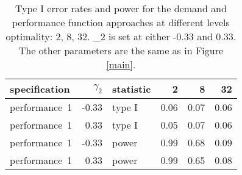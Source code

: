 \begin{table}[ht]
\centering
\begingroup\footnotesize
\begin{tabular}{lrlrrr}
  \hline
specification & $\gamma_2$ & statistic & 2 & 8 & 32 \\ 
  \hline
performance~1 & -0.33 & type I & 0.06 & 0.07 & 0.06 \\ 
  performance~1 & 0.33 & type I & 0.05 & 0.07 & 0.06 \\ 
  performance~1 & -0.33 & power & 0.99 & 0.68 & 0.09 \\ 
  performance~1 & 0.33 & power & 0.99 & 0.65 & 0.08 \\ 
   \hline
\end{tabular}
\endgroup
\caption{Type I error rates and power for the demand and 
  performance function approaches at different levels optimality: 
  2, 8, 32. \gamma_2 is set at either -0.33 and 0.33. The other 
  parameters are the same as in Figure \ref{main}.} 
\label{bootstrap-table}
\end{table}
